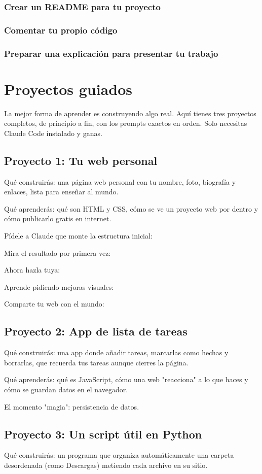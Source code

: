 \documentclass[11pt,a4paper]{book}
\begin{document}
\subsection{Crear un README para tu proyecto}
\subsection{Comentar tu propio código}
\subsection{Preparar una explicación para presentar tu trabajo}
\chapter{Proyectos guiados}
La mejor forma de aprender es construyendo algo real. Aquí tienes tres proyectos completos, de principio a fin, con los prompts exactos en orden. Solo necesitas Claude Code instalado y ganas.

\section{Proyecto 1: Tu web personal}
Qué construirás: una página web personal con tu nombre, foto, biografía y enlaces, lista para enseñar al mundo.

Qué aprenderás: qué son HTML y CSS, cómo se ve un proyecto web por dentro y cómo publicarlo gratis en internet.

Pídele a Claude que monte la estructura inicial:

Mira el resultado por primera vez:

Ahora hazla tuya:

Aprende pidiendo mejoras visuales:

Comparte tu web con el mundo:

\section{Proyecto 2: App de lista de tareas}
Qué construirás: una app donde añadir tareas, marcarlas como hechas y borrarlas, que recuerda tus tareas aunque cierres la página.

Qué aprenderás: qué es JavaScript, cómo una web "reacciona" a lo que haces y cómo se guardan datos en el navegador.

El momento "magia": persistencia de datos.

\section{Proyecto 3: Un script útil en Python}
Qué construirás: un programa que organiza automáticamente una carpeta desordenada (como Descargas) metiendo cada archivo en su sitio.
\end{document}
